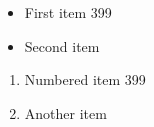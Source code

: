 \documentclass{article}
\begin{document}
\begin{itemize}
\item First item 399
\item Second item
\end{itemize}
\begin{enumerate}
\item Numbered item 399
\item Another item
\end{enumerate}
\end{document}

